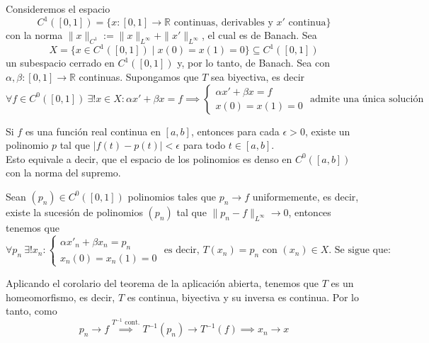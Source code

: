 \noindent 
Consideremos el espacio 
$$C^1([0, 1]) = \{ x : [0, 1] \to \mathbb{R} \text{ continuas, derivables y } x' \text{ continua} \}$$ 
con la norma $\|x\|_{C^1} := \|x\|_{L^\infty} + \|x'\|_{L^\infty}$, el cual es de Banach. Sea 
$$X = \{ x \in C^1([0, 1]) \mid x(0) = x(1) = 0 \} \subseteq C^1([0, 1])$$ 
un subespacio cerrado en $C^1([0, 1])$ y, por lo tanto, de Banach. Sea 
con $\alpha, \beta : [0, 1] \to \mathbb{R}$ continuas. Supongamos que $T$ sea biyectiva, es decir
\begin{equation*}
    \forall f \in C^0([0, 1]) \ \exists! x \in X : \alpha x' + \beta x = f \implies \begin{cases}
            \alpha x' + \beta x = f \\ x(0) = x(1) = 0 
    \end{cases}
    \text{ admite una única solución}
\end{equation*}

\begin{teo}
    Si $f$ es una función real continua en $[a, b]$, entonces para cada $\epsilon > 0$, existe un polinomio $p$ tal que $|f(t) - p(t)| < \epsilon$ para todo $t \in [a, b]$. \\
    \noindent
    Esto equivale a decir, que el espacio de los polinomios es denso en $C^0([a, b])$ con la norma del supremo.
\end{teo}


\noindent 
Sean $(p_n) \in C^0([0, 1])$ polinomios tales que $p_n \to f$ uniformemente, es decir, existe la sucesión de polinomios $(p_n)$ tal que $\|p_n - f\|_{L^\infty} \to 0$, entonces tenemos que
\[ \forall p_n \ \exists! x_n : \begin{cases} \alpha x'_n + \beta x_n = p_n \\ x_n(0) = x_n(1) = 0 \end{cases} \text{ es decir, } T(x_n) = p_n \text{ con } (x_n) \in X. \text{ Se sigue que:} \]

\noindent 
Aplicando el corolario del teorema de la aplicación abierta, tenemos que $T$ es un homeomorfismo, es decir, $T$ es continua, biyectiva y su inversa es continua. Por lo tanto, como
\begin{equation*}
    p_n \to f \overset{T^{-1} \text{ cont.}}{\implies} T^{-1}(p_n) \to T^{-1}(f) \implies x_n \to x
\end{equation*}

